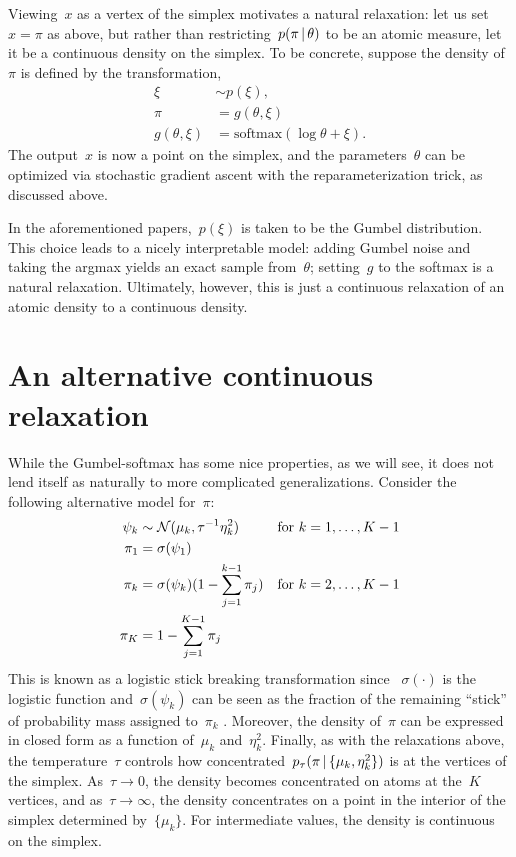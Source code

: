 Viewing~$x$ as a vertex of the simplex motivates a natural relaxation:
let us set~$x={\pi}$ as above, but 
rather than restricting~$p({\pi} \, | \, \theta)$ to be an atomic measure,
let it be a continuous density on the simplex. To be concrete, suppose
the density of~${\pi}$ is defined by the transformation,
\begin{align}
  \xi &\sim p(\xi), \\
  {\pi} &= g(\theta, \xi) \\
  g(\theta, \xi) &= \text{softmax}(\log \theta + \xi).
\end{align}
The output~$x$ is now a point on the simplex, and the parameters~$\theta$ can
be optimized via stochastic gradient ascent with the reparameterization trick,
as discussed above.

In the aforementioned papers,~$p(\xi)$ is taken to be the Gumbel distribution.
This choice leads to a nicely interpretable model: adding
Gumbel noise and taking the argmax yields an exact sample from~$\theta$;
setting~$g$ to the softmax is a natural relaxation. Ultimately, however, this
is just a continuous relaxation of an atomic density to a continuous
density. 

\section{An alternative continuous relaxation}
While the Gumbel-softmax has some nice properties, as we will see, it does
not lend itself as naturally to more complicated generalizations. 
Consider the following alternative model for~${\pi}$:
\begin{align}
  \psi_k &\sim \mathcal{N}(\mu_k, \tau^{-1} \eta_k^2) & &  \text{for } k=1, \ldots, K-1\\
  {\pi}_1 &= \sigma(\psi_1) \\
  {\pi}_k &= \sigma(\psi_k) (1- \sum_{j=1}^{k-1} {\pi}_j) & &  \text{for } k=2, \ldots, K-1\\
{\pi}_K &= 1- \sum_{j=1}^{K-1} {\pi}_j
\end{align}
This is known as a logistic stick breaking transformation since
~$\sigma(\cdot)$ is the logistic function and~$\sigma(\psi_k)$ can be
seen as the fraction of the remaining ``stick'' of probability mass
assigned to~${\pi}_k$ \citep{linderman2015dependent}. Moreover,
the density of~${\pi}$ can be expressed in closed form as a
function of~$\mu_k$ and~$\eta_k^2$.  Finally, as with the relaxations
above, the temperature~$\tau$ controls how
concentrated~$p_\tau({\pi} \, | \, \{\mu_k, \eta_k^2\})$ is at the
vertices of the simplex. As~$\tau \to 0$, the density becomes
concentrated on atoms at the~$K$ vertices, and as~$\tau \to \infty$,
the density concentrates on a point in the interior of the simplex
determined by~$\{\mu_k\}$. For intermediate values, the density is
continuous on the simplex.


